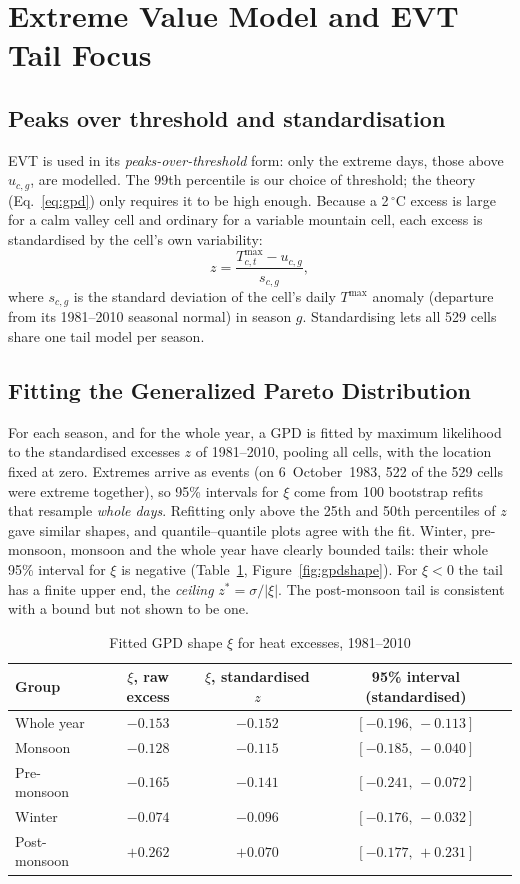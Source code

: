 \documentclass[12pt,a4paper]{report}
\begin{document}
\section{Extreme Value Model and EVT Tail Focus}
\label{sec:evtmodel}
\subsection{Peaks over threshold and standardisation}
EVT is used in its \emph{peaks-over-threshold} form: only the extreme days, those above $u_{c,g}$, are modelled. The
99th percentile is our choice of threshold; the theory (Eq.~\ref{eq:gpd}) only requires it to be high enough. Because a
2\,$^\circ$C excess is large for a calm valley cell and ordinary for a variable mountain cell, each excess is
standardised by the cell's own variability:
\begin{equation}
  z=\frac{T^{\max}_{c,t}-u_{c,g}}{s_{c,g}},
  \label{eq:z}
\end{equation}
where $s_{c,g}$ is the standard deviation of the cell's daily $T^{\max}$ anomaly (departure from its 1981--2010
seasonal normal) in season $g$. Standardising lets all 529 cells share one tail model per season.

\subsection{Fitting the Generalized Pareto Distribution}
For each season, and for the whole year, a GPD is fitted by maximum likelihood to the standardised excesses $z$ of
1981--2010, pooling all cells, with the location fixed at zero. Extremes arrive as events (on 6~October~1983, 522 of the
529 cells were extreme together), so 95\% intervals for $\xi$ come from 100 bootstrap refits that resample
\emph{whole days}. Refitting only above the 25th and 50th percentiles of $z$ gave similar shapes, and quantile--quantile
plots agree with the fit. Winter, pre-monsoon, monsoon and the whole year have clearly bounded tails: their whole 95\% interval for $\xi$ is
negative (Table~\ref{tab:gpd}, Figure~\ref{fig:gpdshape}). For $\xi<0$ the tail has a finite upper end, the
\emph{ceiling} $z^{*}=\sigma/|\xi|$. The post-monsoon tail is consistent with a bound but not shown to be one.

\begin{table}[H]
\centering
\caption{Fitted GPD shape $\xi$ for heat excesses, 1981--2010}
\label{tab:gpd}
\small
\begin{tabular}{|l|c|c|c|}
\hline
\textbf{Group} & \textbf{$\xi$, raw excess} & \textbf{$\xi$, standardised $z$} & \textbf{95\% interval (standardised)}\\ \hline
Whole year & $-0.153$ & $-0.152$ & $[-0.196,\,-0.113]$\\ \hline
Monsoon & $-0.128$ & $-0.115$ & $[-0.185,\,-0.040]$\\ \hline
Pre-monsoon & $-0.165$ & $-0.141$ & $[-0.241,\,-0.072]$\\ \hline
Winter & $-0.074$ & $-0.096$ & $[-0.176,\,-0.032]$\\ \hline
Post-monsoon & $+0.262$ & $+0.070$ & $[-0.177,\,+0.231]$\\ \hline
\end{tabular}
\end{table}
\end{document}
